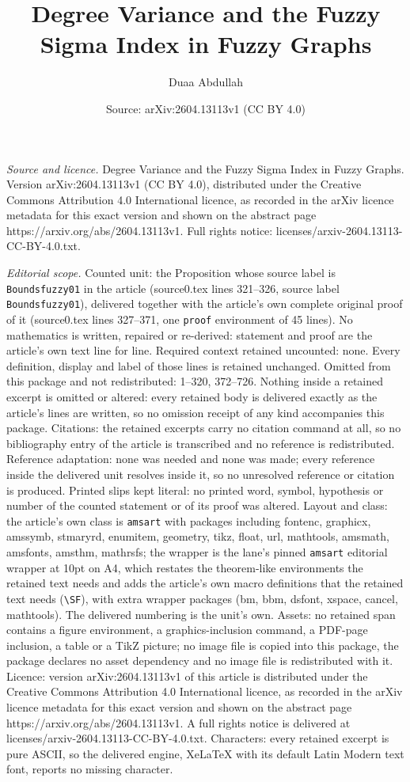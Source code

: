 \documentclass[10pt,a4paper]{amsart}
\title[Degree Variance and the Fuzzy Sigma Index in Fuzzy Graphs]{Degree Variance and the Fuzzy Sigma Index in Fuzzy Graphs}
\author{Duaa Abdullah}
\date{Source: arXiv:2604.13113v1 (CC BY 4.0)}
\begin{document}
\maketitle

\noindent\emph{Source and licence.} Degree Variance and the Fuzzy Sigma Index in Fuzzy Graphs. Version arXiv:2604.13113v1 (CC BY 4.0), distributed under the Creative Commons Attribution 4.0 International licence, as recorded in the arXiv licence metadata for this exact version and shown on the abstract page https://arxiv.org/abs/2604.13113v1. Full rights notice: licenses/arxiv-2604.13113-CC-BY-4.0.txt.\par\smallskip

\noindent\textit{Editorial scope.} Counted unit: the Proposition whose source label is \texttt{Boundsfuzzy01} in the article (source0.tex lines 321--326, source label \texttt{Boundsfuzzy01}), delivered together with the article's own complete original proof of it (source0.tex lines 327--371, one \texttt{proof} environment of 45 lines). No mathematics is written, repaired or re-derived: statement and proof are the article's own text line for line. Required context retained uncounted: none. Every definition, display and label of those lines is retained unchanged. Omitted from this package and not redistributed: 1--320, 372--726. Nothing inside a retained excerpt is omitted or altered: every retained body is delivered exactly as the article's lines are written, so no omission receipt of any kind accompanies this package. Citations: the retained excerpts carry no citation command at all, so no bibliography entry of the article is transcribed and no reference is redistributed. Reference adaptation: none was needed and none was made; every reference inside the delivered unit resolves inside it, so no unresolved reference or citation is produced. Printed slips kept literal: no printed word, symbol, hypothesis or number of the counted statement or of its proof was altered. Layout and class: the article's own class is \texttt{amsart} with packages including fontenc, graphicx, amssymb, stmaryrd, enumitem, geometry, tikz, float, url, mathtools, amsmath, amsfonts, amsthm, mathrsfs; the wrapper is the lane's pinned \texttt{amsart} editorial wrapper at 10pt on A4, which restates the theorem-like environments the retained text needs and adds the article's own macro definitions that the retained text needs (\texttt{\textbackslash SF}), with extra wrapper packages (bm, bbm, dsfont, xspace, cancel, mathtools). The delivered numbering is the unit's own. Assets: no retained span contains a figure environment, a graphics-inclusion command, a PDF-page inclusion, a table or a TikZ picture; no image file is copied into this package, the package declares no asset dependency and no image file is redistributed with it. Licence: version arXiv:2604.13113v1 of this article is distributed under the Creative Commons Attribution 4.0 International licence, as recorded in the arXiv licence metadata for this exact version and shown on the abstract page https://arxiv.org/abs/2604.13113v1. A full rights notice is delivered at licenses/arxiv-2604.13113-CC-BY-4.0.txt. Characters: every retained excerpt is pure ASCII, so the delivered engine, XeLaTeX with its default Latin Modern text font, reports no missing character.
\end{document}
